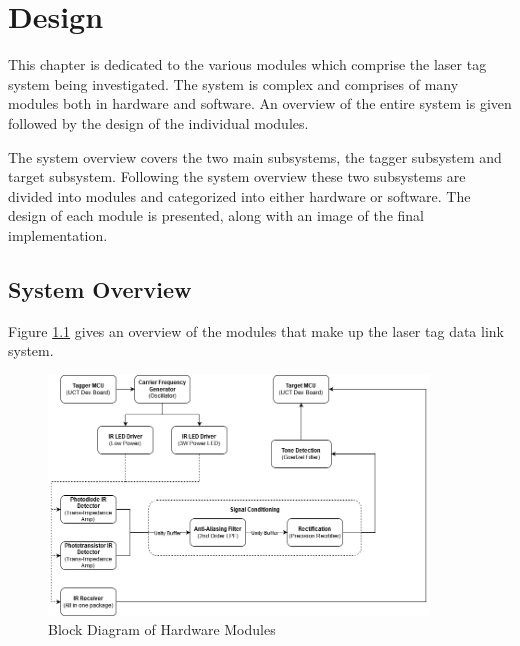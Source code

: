 \chapter{Design}
\label{ch_design}

This chapter is dedicated to the various modules which comprise the laser tag system being investigated. The system is complex and comprises of many modules both in hardware and software. An overview of the entire system is given followed by the design of the individual modules.

The system overview covers the two main subsystems, the tagger subsystem and target subsystem. Following the system overview these two subsystems are divided into modules and categorized into either hardware or software. The design of each module is presented, along with an image of the final implementation.



\section{System Overview}

Figure \ref{fig:system_overview_hardware} gives an overview of the modules that make up the laser tag data link system.

\begin{figure}[H]
	\centering
	\includegraphics[width=0.9\textwidth]{figures/design/system_overview_hardware}
	\caption{Block Diagram of Hardware Modules}
	\label{fig:system_overview_hardware}
\end{figure}

